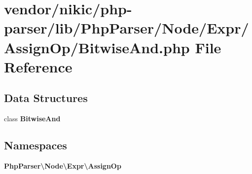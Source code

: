 \section{vendor/nikic/php-\/parser/lib/\+Php\+Parser/\+Node/\+Expr/\+Assign\+Op/\+Bitwise\+And.php File Reference}
\label{_assign_op_2_bitwise_and_8php}
\subsection*{Data Structures}
\begin{DoxyCompactItemize}
\item 
class {\bf Bitwise\+And}
\end{DoxyCompactItemize}
\subsection*{Namespaces}
\begin{DoxyCompactItemize}
\item 
 {\bf Php\+Parser\textbackslash{}\+Node\textbackslash{}\+Expr\textbackslash{}\+Assign\+Op}
\end{DoxyCompactItemize}
